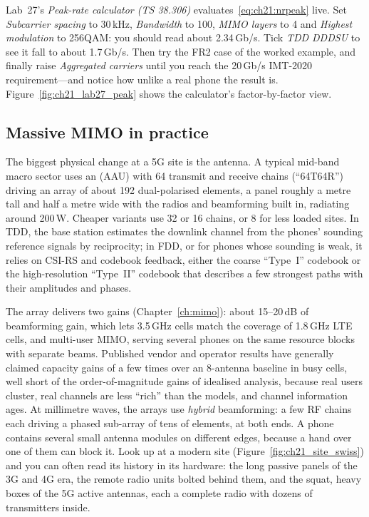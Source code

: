 \begin{tryit}
Lab~27's \emph{Peak-rate calculator (TS 38.306)} evaluates~\eqref{eq:ch21:nrpeak} live. Set
\emph{Subcarrier spacing} to 30\,kHz, \emph{Bandwidth} to 100, \emph{MIMO layers} to 4 and
\emph{Highest modulation} to 256QAM: you should read about 2.34\,Gb/s. Tick \emph{TDD DDDSU} to see
it fall to about 1.7\,Gb/s. Then try the FR2 case of the worked example, and finally raise
\emph{Aggregated carriers} until you reach the 20\,Gb/s IMT-2020 requirement---and notice how unlike
a real phone the result is. Figure~\ref{fig:ch21_lab27_peak} shows the calculator's factor-by-factor
view.
\end{tryit}

\subsection{Massive MIMO in practice}

The biggest physical change at a 5G site is the antenna. A typical mid-band macro sector uses an
 (AAU) with 64 transmit and receive chains (``64T64R'') driving an array of
about 192 dual-polarised elements, a panel roughly a metre tall and half a metre wide with the radios
and beamforming built in, radiating around 200\,W. Cheaper variants use 32 or 16 chains, or 8 for less
loaded sites. In TDD, the base station estimates the downlink channel from the phones' sounding
reference signals by reciprocity; in FDD, or for phones whose sounding is weak, it relies on CSI-RS
and codebook feedback, either the coarse ``Type~I'' codebook or the high-resolution ``Type~II''
codebook that describes a few strongest paths with their amplitudes and phases.


The array delivers two gains (Chapter~\ref{ch:mimo}): about 15--20\,dB of beamforming gain, which
lets 3.5\,GHz cells match the coverage of 1.8\,GHz LTE cells, and multi-user MIMO, serving several
phones on the same resource blocks with separate beams. Published vendor and operator results have
generally claimed capacity gains of a few times over an 8-antenna baseline in busy cells, well short
of the order-of-magnitude gains of idealised analysis, because real users cluster, real channels are
less ``rich'' than the models, and channel information ages. At millimetre waves, the arrays use
\emph{hybrid} beamforming: a few RF chains each driving a phased sub-array of tens of elements, at
both ends. A phone contains several small antenna modules on different edges, because a hand over one
of them can block it. Look up at a modern site (Figure~\ref{fig:ch21_site_swiss}) and you can often
read its history in its hardware: the long passive panels of the 3G and 4G era, the remote radio
units bolted behind them, and the squat, heavy boxes of the 5G active antennas, each a complete
radio with dozens of transmitters inside.

